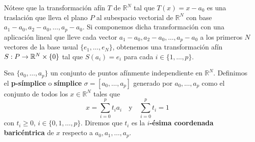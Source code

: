 Nótese que la transformación afín $T$ de $\mathbb{R}^{N}$ tal que
$T(x) = x - a_{0}$ es una traslación que lleva el plano $P$ al subespacio
vectorial de $\mathbb{R}^{N}$ con base
$a_{1}-a_{0}, a_{2}-a_{0}, \ldots, a_{p}-a_{0}$. Si componemos dicha transformación
con una aplicación lineal que lleve cada vector $a_{1}-a_{0}, a_{2}-a_{0}, \ldots
, a_{p}-a_{0}$ a los primeros $N$ vectores de la base usual $\{e_1, \ldots, e_N\}$, obtenemos una
transformación afín $S: P \rightarrow \mathbb{R}^{N}\times \{0\}$ tal que
$S(a_{i}) = e_i$ para cada $i \in \{1, \ldots, p\}$.

\begin{definicion}
	\label{def:simplex} Sea $\{a_{0}, \ldots, a_{p}\}$ un conjunto de puntos afínmente
	independiente en $\mathbb{R}^{N}$. Definimos el \textbf{p-símplice} o \textbf{símplice}
	$\sigma = [a_{0}, \ldots, a_{p}]$ generado por $a_{0}, \ldots, a_{p}$ como el
	conjunto de todos los $x \in \mathbb{R}^{N}$ tales que
	\[
	x=\sum_{i=0}^{p}t_{i}a_{i}\quad \text{y}\quad \sum_{i=0}^{p}t_{i}=1
	\]
	con $t_{i}\geq 0$, $i \in \{0, 1, \ldots, p\}$. Diremos que $t_{i}$ es la
	\textbf{$i$-ésima coordenada baricéntrica} de $x$ respecto a $a_{0}, a_{1}, \ldots
	, a_{p}$.
\end{definicion}

